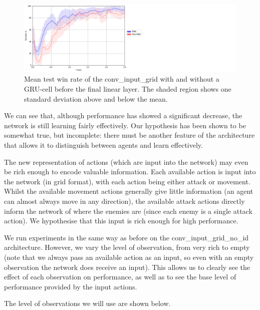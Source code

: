 \begin{figure}
    \centering
    \hbox{\hspace{5em}\includegraphics[scale=0.5]{images/graphs/rnn.png}}
    \caption{Mean test win rate of the conv\_input\_grid with and without a GRU-cell before the final linear layer. The shaded region shows one standard deviation above and below the mean.}
    \label{fig:rnnvsnonrnn}
\end{figure}


We can see that, although performance has showed a significant decrease, the network is still learning fairly effectively. Our hypothesis has been shown to be somewhat true, but incomplete: there must be another feature of the architecture that allows it to distinguish between agents and learn effectively. 

The new representation of actions (which are input into the network) may even be rich enough to encode valuable information. Each available action is input into the network (in grid format), with each action being either attack or movement. Whilst the available movement actions generally give little information (an agent can almost always move in any direction), the available attack actions directly inform the network of where the enemies are (since each enemy is a single attack action). We hypothesise that this input is rich enough for high performance.


We run experiments in the same way as before on the conv\_input\_grid\_no\_id architecture. However, we vary the level of observation, from very rich to empty (note that we always pass an available action as an input, so even with an empty observation the network does receive an input). This allows us to clearly see the effect of each observation on performance, as well as to see the base level of performance provided by the input actions.

The level of observations we will use are shown below.

